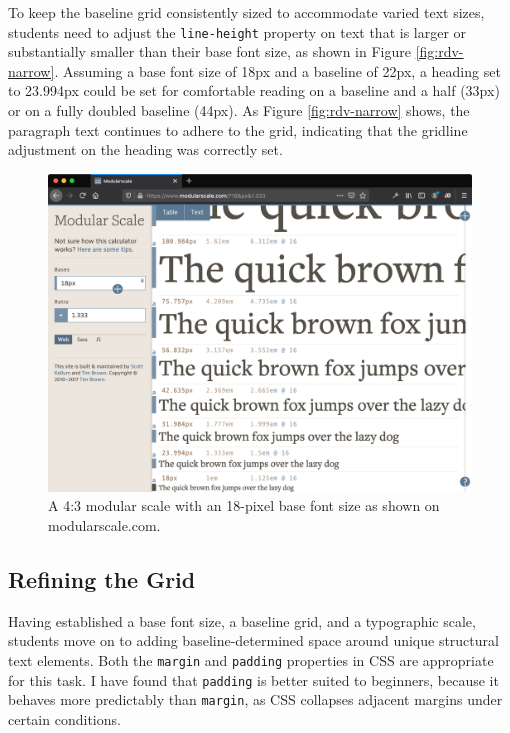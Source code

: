 \documentclass[sigplan,screen]{acmart}
\begin{document}
To keep the baseline grid consistently sized to accommodate varied text sizes, students need to adjust the \verb|line-height| property on text that is larger or substantially smaller than their base font size, as shown in Figure \ref{fig:rdv-narrow}. Assuming a base font size of 18px and a baseline of 22px, a heading set to 23.994px could be set for comfortable reading on a baseline and a half (33px) or on a fully doubled baseline (44px). As Figure \ref{fig:rdv-narrow} shows, the paragraph text continues to adhere to the grid, indicating that the gridline adjustment on the heading was correctly set.

\begin{figure}
  \includegraphics[width=\linewidth]{modular-scale}
  \caption{A 4:3 modular scale with an 18-pixel base font size as shown on modularscale.com.}
  \label{fig:modscale}
\end{figure}


\subsection{Refining the Grid}

Having established a base font size, a baseline grid, and a typographic scale, students move on to adding baseline-determined space around unique structural text elements. Both the \verb|margin| and \verb|padding| properties in CSS are appropriate for this task. I have found that \verb|padding| is better suited to beginners, because it behaves more predictably than \verb|margin|, as CSS collapses adjacent margins under certain conditions.
\end{document}
